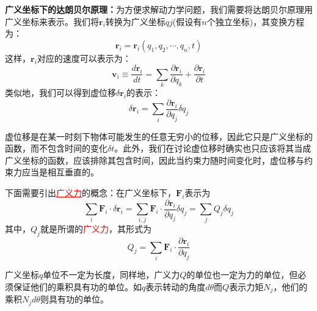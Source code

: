 \textbf{广义坐标下的达朗贝尔原理：}为方便求解动力学问题，我们需要将达朗贝尔原理用广义坐标来表示。我们将$\bm{r}_i$转换为广义坐标$q{j}$(假设有$n$个独立坐标)，其变换方程为：
\begin{equation*}
	\bm{r}_i = \bm{r}_i(q_1, q_2, \cdots , q_n, t)
\end{equation*} 
这样，$\bm{r}_i$对应的速度可以表示为：
\begin{equation*}
	\bm{v}_i \equiv \frac{d\bm{r}_i}{dt} = \sum_k \frac{\partial \bm{r}_i}{\partial q_k} + \frac{\partial \bm{r}_i}{\partial t}
\end{equation*} 
类似地，我们可以得到虚位移$\delta\bm{r}_i$的表示：
\begin{equation*}
	\delta\bm{r}_i = \sum_i \frac{\partial \bm{r}_i}{\partial q_j}\delta q_j
\end{equation*} 
\begin{note}
	虚位移是在某一时刻下物体可能发生的任意无穷小的位移，因此它只是广义坐标的函数，而不包含时间的变化$\delta t$。此外，我们在讨论虚位移时确实也只应该将其当成广义坐标的函数，应该排除其包含时间，因此当约束力随时间变化时，虚位移与约束力应当是相互垂直的。
\end{note}
下面需要引出\textcolor{red}{\underline{广义力}}的概念：在广义坐标下，$\bm{F}_i$表示为
\begin{equation}
	\sum_i \bm{F}_i \cdot \delta \bm{r}_i = \sum_{i, j}\bm{F}_i \cdot \frac{\partial \bm{r}_i}{\partial q_j} \delta q_j = \sum_{j} Q_j \delta q_j
\end{equation} 
其中，$Q_j$就是所谓的\textcolor{red}{广义力}，其形式为
\begin{equation}
	Q_j = \sum_{i} \bm{F}_i \cdot \frac{\partial \bm{r}_i}{\partial q_j}	\label{eq_generalized_force}
\end{equation} 
\begin{note}
	广义坐标$q$单位不一定为长度，同样地，广义力$Q$的单位也一定为力的单位，但必须保证他们的乘积具有功的单位。如$q$表示转动的角度$d\theta$而$Q$表示力矩$N_j$，他们的乘积$N_j d\theta$则具有功的单位。
\end{note}





